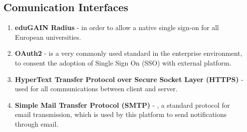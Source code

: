 \subsection{Comunication Interfaces}
\begin{enumerate}
    \item \textbf{eduGAIN Radius} - in order to allow a native single sign-on for all European universities.
    \item \textbf{OAuth2} - is a very commonly used standard in the enterprise environment, to consent the adoption of Single Sign On (SSO) with external platform.
    \item \textbf{HyperText Transfer Protocol over Secure Socket Layer (HTTPS)} - used for all communications between client  and server.
    \item \textbf{Simple Mail Transfer Protocol (SMTP)} - , a standard protocol for email transmission, which is used by this platform to send notifications through email.
\end{enumerate}

